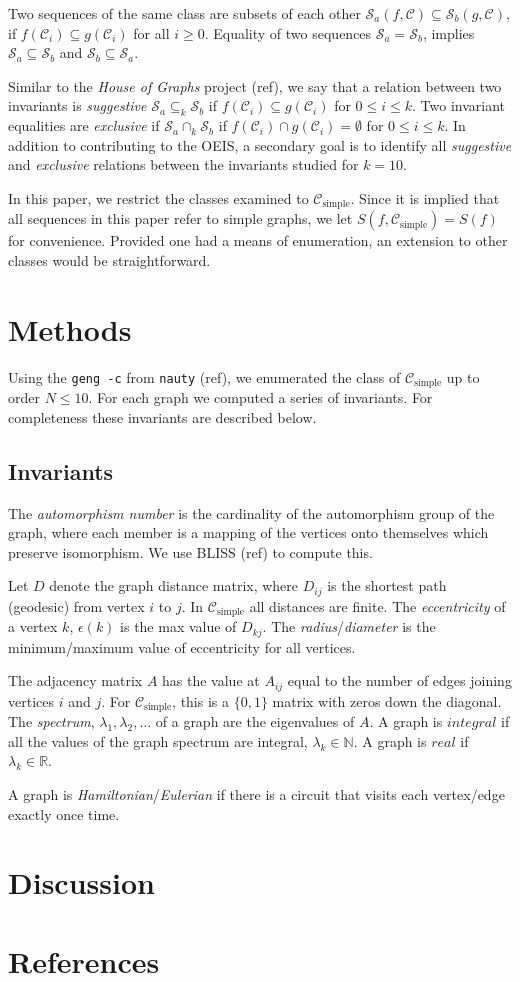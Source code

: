 \documentclass[12pt]{article}
\newcommand{\SEQ}{\mathcal{S}}
\newcommand{\CLASS}{\mathcal{C}}
\newcommand{\SIMPLECLASS}{\mathcal{C}_\text{simple}}
\begin{document}
Two sequences of the same class are subsets of each other $\SEQ_a(f,\CLASS) \subseteq \SEQ_b(g, \CLASS)$, if $f(\CLASS_i) \subseteq g(\CLASS_i)$ for all $i\ge0$.
Equality of two sequences $\SEQ_a = \SEQ_b$, implies $\SEQ_a \subseteq \SEQ_b$ and $\SEQ_b \subseteq \SEQ_a$. 

Similar to the \textit{House of Graphs} project (ref), we say that a relation between two invariants is \textit{suggestive} $\SEQ_a \subseteq_k \SEQ_b$ if $f(\CLASS_i) \subseteq g(\CLASS_i)$ for $0 \le i \le k$.
Two invariant equalities are \textit{exclusive} if $\SEQ_a \cap_k \SEQ_b$ if $f(\CLASS_i) \cap g(\CLASS_i) = \emptyset$ for $0 \le i \le k$.
In addition to contributing to the OEIS, a secondary goal is to identify all \textit{suggestive} and \textit{exclusive} relations between the invariants studied for $k=10$.

In this paper, we restrict the classes examined to $\SIMPLECLASS$.
Since it is implied that all sequences in this paper refer to simple graphs, we let $S(f,\SIMPLECLASS)=S(f)$ for convenience.
Provided one had a means of enumeration, an extension to other classes would be straightforward.


\section{Methods}
Using the \texttt{geng -c} from \texttt{nauty} (ref), we enumerated the class of $\SIMPLECLASS$ up to order $N \le 10$.
For each graph we computed a series of invariants.
For completeness these invariants are described below.

\subsection{Invariants}

The \textit{automorphism number} is the cardinality of the automorphism group of the graph, where each member is a mapping of the vertices onto themselves which preserve isomorphism. We use BLISS (ref) to compute this.

Let $D$ denote the graph distance matrix, where $D_{ij}$ is the shortest path (geodesic) from vertex $i$ to $j$.
In $\SIMPLECLASS$ all distances are finite.
The \textit{eccentricity} of a vertex $k$, $\epsilon(k)$ is the max value of $D_{k j}$.
The \textit{radius}/\textit{diameter} is the minimum/maximum value of eccentricity for all vertices.

The adjacency matrix $A$ has the value at $A_{ij}$ equal to the number of edges joining vertices $i$ and $j$.
For $\SIMPLECLASS$, this is a $\{0,1\}$ matrix with zeros down the diagonal.
The \textit{spectrum}, $\lambda_1, \lambda_2, \ldots$ of a graph are the eigenvalues of $A$.
A graph is $integral$ if all the values of the graph spectrum are integral, $\lambda_k \in \mathbb{N}$.
A graph is $real$ if $\lambda_k \in \mathbb{R}$.

A graph is \textit{Hamiltonian}/\textit{Eulerian} if there is a circuit that visits each vertex/edge exactly once time.

\section{Discussion}


\section{References}
\end{document}
